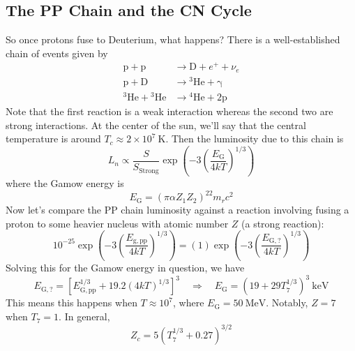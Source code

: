 \documentclass[10pt]{article}
\numberwithin{equation}{section}
\begin{document}
  \subsection{The PP Chain and the CN Cycle}
  \label{sec:pp-chain}

  So once protons fuse to Deuterium, what happens? There is a
  well-established chain of events given by
  \begin{align}
    \label{eq:164}
    \mathrm{p+p}&\to \mathrm{D+}e^++\nu_e\\
    \label{eq:164a}
    \mathrm{p+D} &\to\mathrm{{}^3He+\gamma}\\
    \label{eq:164b}
    \mathrm{{}^3He+{}^3He}&\to \mathrm{{}^4He+2p}
  \end{align}
  Note that the first reaction is a weak interaction whereas the
  second two are strong interactions. At the center of the sun, we'll
  say that the central temperature is around $T_c\approx 2\times 10^7\
  \mathrm{K}$. Then the luminosity due to this chain is
  \begin{equation}
    \label{eq:165}
    L_n\propto \frac{S}{S_{\mathrm{Strong}}}\exp\left(-3\left(\frac{E_
\mathrm{G}}{4kT}\right)^{1/3}\right)
  \end{equation}
  where the Gamow energy is
  \begin{equation}
    \label{eq:166}
    E_{\mathrm{G}}=\left(\pi\alpha Z_1Z_2\right)^22m_rc^2
  \end{equation}
  Now let's compare the PP chain luminosity against a reaction
  involving fusing a proton to some heavier nucleus with atomic number
  $Z$ (a strong reaction):
  \begin{equation}
    \label{eq:167}
    10^{-25}\exp\left(-3\left(\frac{E_{\mathrm{g,pp}}}{4kT}\right)^
{1/3}\right)=(1)\exp\left(-3\left(\frac{E_{\mathrm{G,?}}}{4kT}\right)^
{1/3}\right)
  \end{equation}
  Solving this for the Gamow energy in question, we have
  \begin{equation}
    \label{eq:168}
    E_{\mathrm{G,?}}=\left[E_{\mathrm{G,pp}}^{1/3}+19.2(4kT)^{1/3}\right]^
{3}\quad
    \Rightarrow \quad E_{\mathrm{G}}=\left(19+29 T_7^{1/3}\right)^{3}\ 
\mathrm{keV}
  \end{equation}
  This means this happens when $T\approx 10^7$, where
  $E_{\mathrm{G}}=50\ \mathrm{MeV}$. Notably, $Z=7$ when $T_7=1$. In
  general, 
  \begin{equation}
    \label{eq:169}
    \boxed{Z_c=5\left(T_7^{1/3}+0.27\right)^{3/2}}
  \end{equation}
\end{document}
